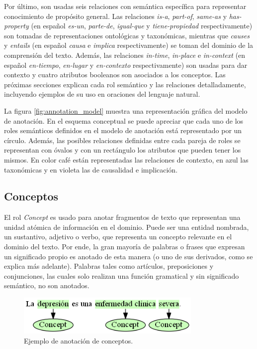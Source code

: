 Por último, son usadas seis relaciones con semántica específica para representar conocimiento de propósito general. Las relaciones
\textit{is-a}, \textit{part-of}, \textit{same-as} y \textit{has-property} (en español \textit{es-un}, \textit{parte-de}, \textit{igual-que} y \textit{tiene-propiedad} respectivamente) son tomadas de representaciones ontológicas y taxonómicas, mientras que \textit{causes} y \textit{entails} (en español \textit{causa} e \textit{implica} respectivamente) se toman del dominio de la comprensión del texto. Además, las relaciones \textit{in-time}, \textit{in-place} e \textit{in-context} (en español \textit{en-tiempo}, \textit{en-lugar} y \textit{en-contexto} respectivamente) son usadas para dar contexto y cuatro atributos booleanos son asociados a los conceptos. Las próximas secciones explican cada rol semántico y las relaciones detalladamente, incluyendo ejemplos de su uso en oraciones del lenguaje natural.

La figura \ref{fig:annotation_model} muestra una representación gráfica del modelo de anotación. En el esquema conceptual se puede apreciar que cada uno de los roles semánticos definidos en el modelo de anotación está representado por un círculo. Además, las posibles relaciones definidas entre cada pareja de roles se representan con óvalos y con un rectángulo los atributos que pueden tener los mismos. En color café están representadas las relaciones de contexto, en azul las taxonómicas y en violeta las de causalidad e implicación.

\subsection{Conceptos}
El rol \textit{Concept} es usado para anotar fragmentos de texto que representan una unidad atómica de información en el dominio. Puede ser una entidad nombrada, un sustantivo, adjetivo o verbo, que representa un concepto relevante en el dominio del texto. Por ende, la gran mayoría de palabras o frases que expresan un significado propio es anotado de esta manera (o uno de sus derivados, como se explica más adelante). Palabras tales como artículos, preposiciones y conjunciones, las cuales solo realizan una función gramatical y sin significado semántico, no son anotados.

\begin{figure}[H]
	\begin{center}
		\includegraphics[width=3.5in]{graphics/annotation_example_concept.png}
		\caption[Anotación de conceptos]{Ejemplo de anotación de conceptos.}
		\label{fig:annotation_example_concept}
	\end{center}
\end{figure}

